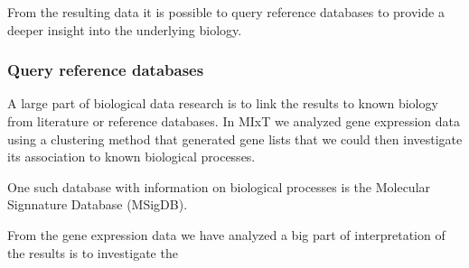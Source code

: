 From the resulting data it is possible to query reference databases to provide a
deeper insight into the underlying biology. 





\subsubsection*{Query reference databases} 
A large part of biological data research is to link the results to known biology
from literature or reference databases. In MIxT we analyzed gene expression
data using a clustering method that generated gene lists that we could then
investigate its association to known biological processes. 

One such database with information on biological processes is the Molecular
Signnature Database (MSigDB).  


From the gene expression data we have analyzed a big part of interpretation of
the results is to investigate the 

